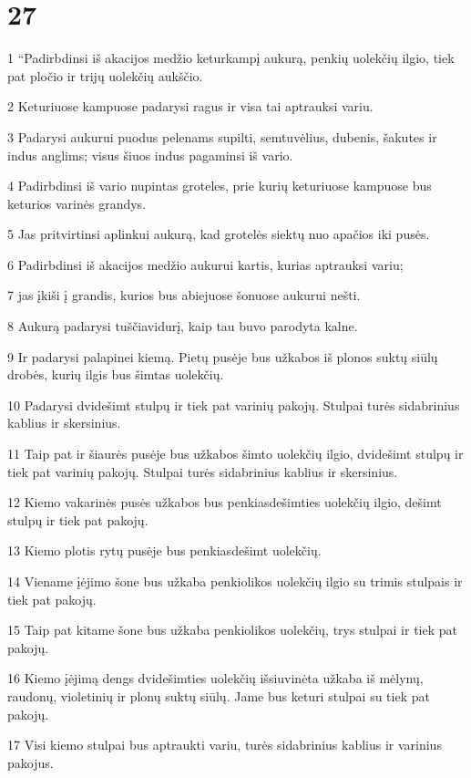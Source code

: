 \chapter{27}


\par 1 “Padirbdinsi iš akacijos medžio keturkampį aukurą, penkių uolekčių ilgio, tiek pat pločio ir trijų uolekčių aukščio. 
\par 2 Keturiuose kampuose padarysi ragus ir visa tai aptrauksi variu. 
\par 3 Padarysi aukurui puodus pelenams supilti, semtuvėlius, dubenis, šakutes ir indus anglims; visus šiuos indus pagaminsi iš vario. 
\par 4 Padirbdinsi iš vario nupintas groteles, prie kurių keturiuose kampuose bus keturios varinės grandys. 
\par 5 Jas pritvirtinsi aplinkui aukurą, kad grotelės siektų nuo apačios iki pusės. 
\par 6 Padirbdinsi iš akacijos medžio aukurui kartis, kurias aptrauksi variu; 
\par 7 jas įkiši į grandis, kurios bus abiejuose šonuose aukurui nešti. 
\par 8 Aukurą padarysi tuščiavidurį, kaip tau buvo parodyta kalne. 
\par 9 Ir padarysi palapinei kiemą. Pietų pusėje bus užkabos iš plonos suktų siūlų drobės, kurių ilgis bus šimtas uolekčių. 
\par 10 Padarysi dvidešimt stulpų ir tiek pat varinių pakojų. Stulpai turės sidabrinius kablius ir skersinius. 
\par 11 Taip pat ir šiaurės pusėje bus užkabos šimto uolekčių ilgio, dvidešimt stulpų ir tiek pat varinių pakojų. Stulpai turės sidabrinius kablius ir skersinius. 
\par 12 Kiemo vakarinės pusės užkabos bus penkiasdešimties uolekčių ilgio, dešimt stulpų ir tiek pat pakojų. 
\par 13 Kiemo plotis rytų pusėje bus penkiasdešimt uolekčių. 
\par 14 Viename įėjimo šone bus užkaba penkiolikos uolekčių ilgio su trimis stulpais ir tiek pat pakojų. 
\par 15 Taip pat kitame šone bus užkaba penkiolikos uolekčių, trys stulpai ir tiek pat pakojų. 
\par 16 Kiemo įėjimą dengs dvidešimties uolekčių išsiuvinėta užkaba iš mėlynų, raudonų, violetinių ir plonų suktų siūlų. Jame bus keturi stulpai su tiek pat pakojų. 
\par 17 Visi kiemo stulpai bus aptraukti variu, turės sidabrinius kablius ir varinius pakojus. 
